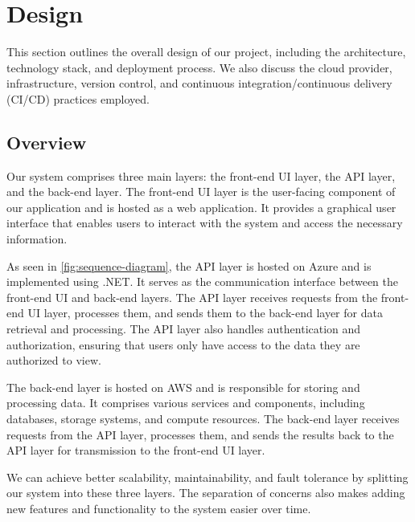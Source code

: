 \section{Design}

This section outlines the overall design of our project, including the architecture, technology stack, and deployment process. We also discuss the cloud provider, infrastructure, version control, and continuous integration/continuous delivery (CI/CD) practices employed. 

\subsection{Overview}

Our system comprises three main layers: the front-end UI layer, the API layer, and the back-end layer. The front-end UI layer is the user-facing component of our application and is hosted as a web application. It provides a graphical user interface that enables users to interact with the system and access the necessary information. 

As seen in \autoref{fig:sequence-diagram}, the API layer is hosted on Azure and is implemented using .NET. It serves as the communication interface between the front-end UI and back-end layers. The API layer receives requests from the front-end UI layer, processes them, and sends them to the back-end layer for data retrieval and processing. The API layer also handles authentication and authorization, ensuring that users only have access to the data they are authorized to view. 

The back-end layer is hosted on AWS and is responsible for storing and processing data. It comprises various services and components, including databases, storage systems, and compute resources. The back-end layer receives requests from the API layer, processes them, and sends the results back to the API layer for transmission to the front-end UI layer. 

We can achieve better scalability, maintainability, and fault tolerance by splitting our system into these three layers. The separation of concerns also makes adding new features and functionality to the system easier over time. 

